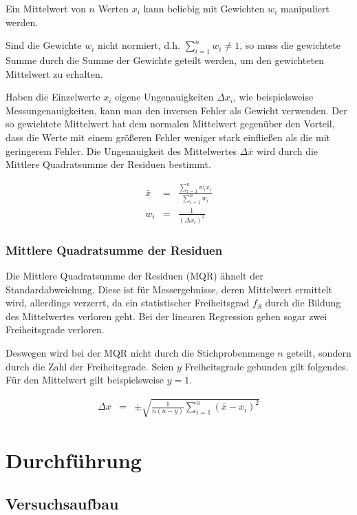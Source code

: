 \documentclass[12pt,a4paper]{scrartcl}
\numberwithin{equation}{section} %
\begin{document}
	Ein Mittelwert von $n$ Werten $x_i$ kann beliebig mit Gewichten $w_i$ manipuliert werden.
	
	Sind die Gewichte $w_i$ nicht normiert, d.h. $\sum_{i=1}^n w_i\neq 1$, so muss die gewichtete Summe durch die Summe der Gewichte geteilt werden, um den gewichteten Mittelwert zu erhalten.
	
	Haben die Einzelwerte $x_i$ eigene Ungenauigkeiten $\Delta x_i$, wie beispielsweise Messungenauigkeiten, kann man den inversen Fehler als Gewicht verwenden. Der so gewichtete Mittelwert hat dem normalen Mittelwert gegenüber den Vorteil, dass die Werte mit einem größeren Fehler weniger stark einfließen als die mit geringerem Fehler. Die Ungenauigkeit des Mittelwertes $\Delta \bar x$ wird durch die Mittlere Quadratsumme der Residuen bestimmt.
	
	\begin{eqnarray}
		\bar{x} &=&
		\frac{\sum_{i=1}^n w_i x_i}{\sum_{i=1}^n w_i}\\
		w_i &=& \frac{1}{(\Delta x_i)^2}
	\end{eqnarray}
	
	\hypertarget{mittlere-quadratsumme-der-residuen}{%
		\subsubsection{Mittlere Quadratsumme der Residuen}\label{mittlere-quadratsumme-der-residuen}}
	
	Die Mittlere Quadratsumme der Residuen (MQR) ähnelt der Standardabweichung. Diese ist für Messergebnisse, deren Mittelwert ermittelt wird, allerdings verzerrt, da ein statistischer Freiheitsgrad $f_S$ durch die Bildung des Mittelwertes verloren geht. Bei der linearen Regression gehen sogar zwei Freiheitsgrade verloren.
	
	Deswegen wird bei der MQR nicht durch die Stichprobenmenge $n$ geteilt, sondern durch die Zahl der Freiheitsgrade. Seien $y$ Freiheitsgrade gebunden gilt folgendes. Für den Mittelwert gilt beispielsweise $y=1$.
	
	\begin{eqnarray}
		\Delta x &=& \pm\sqrt{\frac{1}{n(n - y)}\sum_{i=1}^n(\bar{x}-x_i)^2}
	\end{eqnarray}
	
	\clearpage
	\hypertarget{durchfuxfchrung}{%
		\section{Durchführung}\label{durchfuxfchrung}}
	\subsection{Versuchsaufbau}
	\label{Versuchsaufbau}
	
\end{document}
